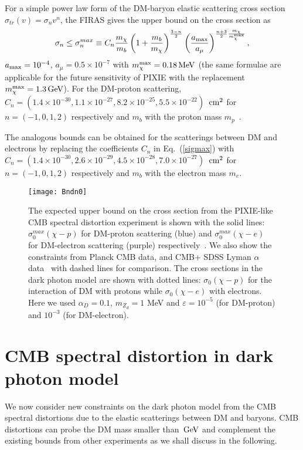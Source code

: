\documentclass[5p,times]{elsarticle}
\newcommand{\dis}[1]{\begin{equation}\begin{split}#1\end{split}\end{equation}}
\newcommand{\eq}[1]{Eq.~(\ref{#1})}
\newcommand\gev{\,{\rm GeV}}
\newcommand\mev{\,{\rm MeV}}
\newcommand\cm{\,{\rm cm}}
\begin{document}
   For a simple power law form of the DM-baryon elastic scattering cross section $\sigma_{tr} (v) =  \sigma_n v^n$, the FIRAS gives the upper bound on the cross section as~\cite{Ali-Haimoud:2015pwa}
\dis{
\sigma_n \leq \sigma_n^{max} \equiv C_n \frac{m_\chi}{m_b}\left( 1+\frac{m_b}{m_\chi}\right)^{\frac{3-n}{2}} \left(\frac{a_{\rm max}}{a_\mu}  \right)^{\frac{n+3}{2}\frac{m_\chi}{m_\chi^{\rm max}}},
\label{sigmax}
}
$a_{\rm max}=10^{-4}$, $a_\mu = 0.5\times 10^{-7}$ with $m_\chi^{\rm max}=0.18\mev$ (the same formulae are applicable for the future sensitivity of PIXIE with the replacement $m_\chi^{\rm max}=1.3\gev$).
For the DM-proton scattering, $C_n = (1.4\times 10^{-30}, 1.1\times 10^{-27}, 8.2\times 10^{-25}, 5.5\times 10^{-22})$ $\cm^2$ for $n=(-1,0,1,2)$ respectively  and $m_b$ with the proton mass $m_p$~\cite{Dvorkin:2013cea}.

The analogous bounds can be obtained for the scatterings between DM and electrons by replacing the coefficients $C_n$ in \eq{sigmax} with $C_n = (1.4\times 10^{-30}, 2.6\times 10^{-29}, 4.5\times 10^{-28}, 7.0\times 10^{-27})$ $\cm^2$  for $n=(-1,0,1,2)$ respectively and $m_b$ with the electron mass $m_e$.




\begin{figure} [b!]
\begin{center}
\texttt{[image: Bndn0]}
\end{center}
\caption{The expected upper bound on the cross section from the PIXIE-like CMB spectral distortion experiment is shown with the solid lines:  $\sigma_0^{max} (\chi-p)$ for DM-proton scattering (blue) and $\sigma_0^{max} (\chi-e)$ for DM-electron scattering (purple) respectively~\cite{Ali-Haimoud:2015pwa}. We also show the constraints from Planck CMB data, and CMB+ SDSS Lyman $\alpha$ data~\cite{Dvorkin:2013cea} with dashed lines for comparison. The cross sections in the dark photon model are shown with dotted lines:  $\sigma_0 (\chi-p)$ for the interaction of DM with protons while  $\sigma_0 (\chi-e)$ with electrons. Here we used $\alpha_D=0.1$,  $m_{Z_d}=1$ MeV and $\varepsilon=10^{-5}$ (for DM-proton) and $10^{-3}$ (for DM-electron). }
\label{Bndn0}
\end{figure}



\section{CMB spectral distortion in dark photon model}
\label{figsec}
We now consider new constraints on the dark photon model from the CMB spectral distortions due to the elastic scatterings between DM and baryons. CMB distortions can probe the DM mass smaller than $\gev$ and complement the existing bounds from other experiments as we shall discuss in the following.
\end{document}
